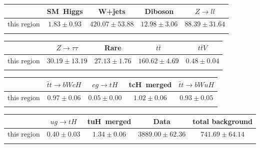 \centering
\begin{tabular}{ccccc} \toprule\toprule
 & SM~Higgs & W+jets & Diboson & $Z\to ll$\\\midrule
this region & $1.83\pm0.93$ & $420.07\pm53.88$ & $12.98\pm3.06$ & $88.39\pm31.64$\\
\bottomrule\bottomrule\\
\end{tabular}
\begin{tabular}{ccccc} \toprule\toprule
 & $Z\to \tau\tau$ & Rare & $t\bar{t}$ & $t\bar{t}V$\\\midrule
this region & $30.19\pm13.19$ & $27.13\pm1.76$ & $160.62\pm4.69$ & $0.48\pm0.04$\\
\bottomrule\bottomrule\\
\end{tabular}
\begin{tabular}{ccccc} \toprule\toprule
 & $\bar{t}t\to bWcH$ & $cg\to tH$ & tcH~merged & $\bar{t}t\to bWuH$\\\midrule
this region & $0.97\pm0.06$ & $0.05\pm0.00$ & $1.02\pm0.06$ & $0.93\pm0.05$\\
\bottomrule\bottomrule\\
\end{tabular}
\begin{tabular}{ccccc} \toprule\toprule
 & $ug\to tH$ & tuH~merged & Data & total background\\\midrule
this region & $0.40\pm0.03$ & $1.34\pm0.06$ & $3889.00\pm62.36$ & $741.69\pm64.14$\\
\bottomrule\bottomrule\\
\end{tabular}
